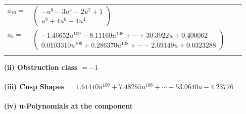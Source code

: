 \documentclass[1p]{elsarticle_modified}
\theoremstyle{definition}
\begin{document}
\begin{tabular}{m{7pt} m{180pt} m{7pt} m{180pt} }
\flushright $a_{10}=$&$\begin{pmatrix}- u^6-3 u^4-2 u^2+1\\u^8+4 u^6+4 u^4\end{pmatrix}$ \\
\flushright $a_{5}=$&$\begin{pmatrix}-1.46652 u^{109}-8.11160 u^{108}+\cdots+30.3922 u+0.400062\\0.0103310 u^{109}+0.286370 u^{108}+\cdots-2.69149 u+0.0323288\end{pmatrix}$\\&\end{tabular}
\flushleft \textbf{(ii) Obstruction class $= -1$}\\~\\
\flushleft \textbf{(iii) Cusp Shapes $= 1.61410 u^{109}+7.48255 u^{108}+\cdots-53.0640 u-4.23776$}\\~\\
\newpage\renewcommand{\arraystretch}{1}
\flushleft \textbf{(iv) u-Polynomials at the component}\newline \\
\end{document}
